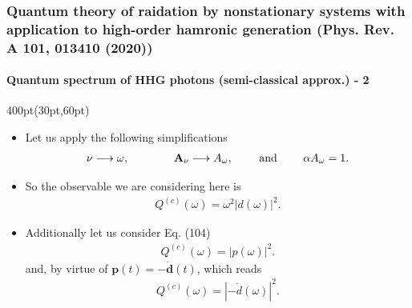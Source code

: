 \begin{frame}
\frametitle{Quantum theory of raidation by nonstationary systems 
	with application to high-order hamronic generation
        (Phys. Rev. A 101, 013410 (2020))}
	\framesubtitle{Quantum spectrum of HHG photons (semi-classical approx.) - 2}

\begin{textblock*}{400pt}(30pt,60pt)
\footnotesize
\begin{itemize}
\item Let us apply the following simplifications
\begin{align}
    \nu \longrightarrow \omega, \hspace{20pt}
    \hspace{20pt} \boldsymbol{\rm A}_\nu \longrightarrow A_\omega, 
    \hspace{20pt}\mbox{ and } \hspace{20pt} \alpha A_\omega = 1.
\end{align}
\item So the observable we are considering here is 
\begin{align}
    Q^{(c)}(\omega) = \omega^2 \left| d(\omega)  \right|^2.
\end{align}
\item Additionally let us consider Eq. (104)
\begin{align}
    Q^{(c)}(\omega) = \left| p(\omega)  \right|^2.
\end{align}
and, by virtue of $\boldsymbol{p}(t)= -\dot{\boldsymbol{d}}(t)$, which reads
\begin{align}
    Q^{(c)}(\omega) = \left| -\dot{d}(\omega)  \right|^2. 
\label{eqn:dipole_mom_diff}
\end{align}

\end{itemize}
\end{textblock*}


\end{frame}


